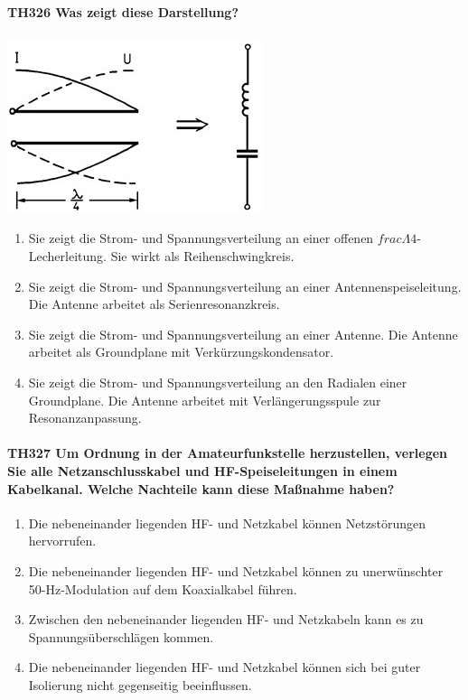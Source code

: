 \documentclass[8pt]{article}
\begin{document}
\paragraph*{TH326 Was zeigt diese Darstellung?}
\begin{center}
	\begin{minipage}{\linewidth}
		\centering
		\includegraphics[scale=1.0]{pics/th326_a.jpg}
	\end{minipage}
\end{center}
\begin{enumerate}[nolistsep,label=\Alph*]
\item Sie zeigt die Strom- und Spannungsverteilung an einer offenen $frac{\Lambda}{4}$-Lecherleitung. Sie wirkt als Reihenschwingkreis.
\item Sie zeigt die Strom- und Spannungsverteilung an einer Antennenspeiseleitung. Die Antenne arbeitet als Serienresonanzkreis. 
\item Sie zeigt die Strom- und Spannungsverteilung an einer Antenne. Die Antenne arbeitet als Groundplane mit Verkürzungskondensator.
\item Sie zeigt die Strom- und Spannungsverteilung an den Radialen einer Groundplane. Die Antenne arbeitet mit Verlängerungsspule zur Resonanzanpassung.
\end{enumerate}

\paragraph*{TH327 Um Ordnung in der Amateurfunkstelle herzustellen, verlegen Sie alle Netzanschlusskabel und HF-Speiseleitungen in einem Kabelkanal. Welche Nachteile kann diese Maßnahme haben?}
\begin{enumerate}[nolistsep,label=\Alph*]
\item Die nebeneinander liegenden HF- und Netzkabel können Netzstörungen hervorrufen. 
\item Die nebeneinander liegenden HF- und Netzkabel können zu unerwünschter 50-Hz-Modulation auf dem Koaxialkabel führen.
\item Zwischen den nebeneinander liegenden HF- und Netzkabeln kann es zu Spannungsüberschlägen kommen.
\item Die nebeneinander liegenden HF- und Netzkabel können sich bei guter Isolierung nicht gegenseitig beeinflussen.
\end{enumerate}
\end{document}
